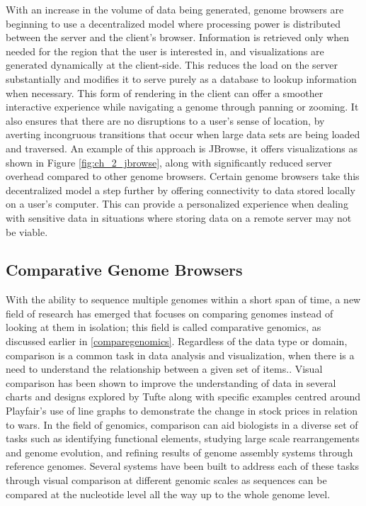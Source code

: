 With an increase in the volume of data being generated, genome browsers are beginning to use a decentralized model where processing power is distributed between the server and the client's browser. Information is retrieved only when needed for the region that the user is interested in, and visualizations are generated dynamically at the client-side. This reduces the load on the server substantially and modifies it to serve purely as a database to lookup information when necessary. This form of rendering in the client can offer a smoother interactive experience while navigating a genome through panning or zooming. It also ensures that there are no disruptions to a user's sense of location, by averting incongruous transitions that occur when large data sets are being loaded and traversed. An example of this approach is JBrowse, it offers visualizations as shown in Figure \ref{fig:ch_2_jbrowse}, along with significantly reduced server overhead compared to other genome browsers\cite{skinner2009jbrowse}.
Certain genome browsers take this decentralized model a step further by offering connectivity to data stored locally on a user's computer\cite{ucscgenome,saito2009utgb}. This can provide a personalized experience when dealing with sensitive data in situations where storing data on a remote server may not be viable. 

\subsection{Comparative Genome Browsers}
With the ability to sequence multiple genomes within a short span of time, a new field of research has emerged that focuses on comparing genomes instead of looking at them in isolation; this field is called comparative genomics, as discussed earlier in \ref{comparegenomics}. Regardless of the data type or domain, comparison is a common task in data analysis and visualization, when there is a need to understand the relationship between a given set of items.\cite{gleicher2017considerations}. Visual comparison has been shown to improve the understanding of data in several charts and designs explored by Tufte\cite{tufte1990envisioning} along with specific examples centred around Playfair's use of line graphs to demonstrate the change in stock prices in relation to wars\cite{costigan1990william}. In the field of genomics, comparison can aid biologists in a diverse set of tasks such as identifying functional elements, studying large scale rearrangements and genome evolution, and refining results of genome assembly systems through reference genomes\cite{nielsen2010visualizing}. Several systems have been built to address each of these tasks through visual comparison at different genomic scales as sequences can be compared at the nucleotide level all the way up to the whole genome level.

